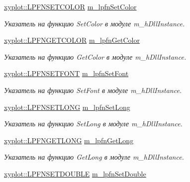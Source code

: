\begin{DoxyCompactItemize}
\hyperlink{namespacexyplot_ac41175dc795758950c58e18d1660faa5}{xyplot\-::\-L\-P\-F\-N\-S\-E\-T\-C\-O\-L\-O\-R} \hyperlink{group__gr_func_pointers_ga9e25ad5afee76a5ea6402649490afa33}{m\-\_\-lpfn\-Set\-Color}
\begin{DoxyCompactList}\small\item\em Указатель на функцию Set\-Color в модуле m\-\_\-h\-Dll\-Instance. \end{DoxyCompactList}\item 
\hyperlink{namespacexyplot_a0f7f51503a885f8e1b24c25973b1fc1d}{xyplot\-::\-L\-P\-F\-N\-G\-E\-T\-C\-O\-L\-O\-R} \hyperlink{group__gr_func_pointers_gaea89de1aabb85ec0bc1744be6c4b8c0e}{m\-\_\-lpfn\-Get\-Color}
\begin{DoxyCompactList}\small\item\em Указатель на функцию Get\-Color в модуле m\-\_\-h\-Dll\-Instance. \end{DoxyCompactList}\item 
\hyperlink{namespacexyplot_a28e8fe476dccb830b8c9557e0f802263}{xyplot\-::\-L\-P\-F\-N\-S\-E\-T\-F\-O\-N\-T} \hyperlink{group__gr_func_pointers_ga20972e1ead3d8fc4ae624436c7c562e5}{m\-\_\-lpfn\-Set\-Font}
\begin{DoxyCompactList}\small\item\em Указатель на функцию Set\-Font в модуле m\-\_\-h\-Dll\-Instance. \end{DoxyCompactList}\item 
\hyperlink{namespacexyplot_a6baf918a5bfe565a879b9d4fe5ef1124}{xyplot\-::\-L\-P\-F\-N\-S\-E\-T\-L\-O\-N\-G} \hyperlink{group__gr_func_pointers_gaaf490a07c7be98e17bef527c3f4f7403}{m\-\_\-lpfn\-Set\-Long}
\begin{DoxyCompactList}\small\item\em Указатель на функцию Set\-Long в модуле m\-\_\-h\-Dll\-Instance. \end{DoxyCompactList}\item 
\hyperlink{namespacexyplot_a7fdb8fd61356e30fc76cd5a02266dbf7}{xyplot\-::\-L\-P\-F\-N\-G\-E\-T\-L\-O\-N\-G} \hyperlink{group__gr_func_pointers_gad700a337b94bdc880881e059f50c6169}{m\-\_\-lpfn\-Get\-Long}
\begin{DoxyCompactList}\small\item\em Указатель на функцию Get\-Long в модуле m\-\_\-h\-Dll\-Instance. \end{DoxyCompactList}\item 
\hyperlink{namespacexyplot_acc2b15a223e822003ec2f51071dd16b2}{xyplot\-::\-L\-P\-F\-N\-S\-E\-T\-D\-O\-U\-B\-L\-E} \hyperlink{group__gr_func_pointers_ga1f974cec0445d2921f6e039830b27942}{m\-\_\-lpfn\-Set\-Double}

\end{DoxyCompactItemize}
